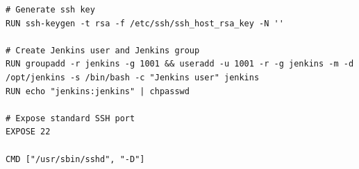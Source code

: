 \documentclass[10pt,utf8]{beamer}
\begin{document}
\begin{frame}[fragile]
{\begin{verbatim}
# Generate ssh key                                                                                                                                                                                               
RUN ssh-keygen -t rsa -f /etc/ssh/ssh_host_rsa_key -N ''                                                                                                                                                         
                                                                                                                                                                                                                 
# Create Jenkins user and Jenkins group                                                                                                                                                                          
RUN groupadd -r jenkins -g 1001 && useradd -u 1001 -r -g jenkins -m -d /opt/jenkins -s /bin/bash -c "Jenkins user" jenkins                                                                                       
RUN echo "jenkins:jenkins" | chpasswd                                                                                                                                                                            
                                                                                                                                                                                                                 
# Expose standard SSH port                                                                                                                                                                                       
EXPOSE 22                                                                                                                                                                                                        
                                                                                                                                                                                                                 
CMD ["/usr/sbin/sshd", "-D"]
		\end{verbatim}
	}
\end{frame}
\end{document}
